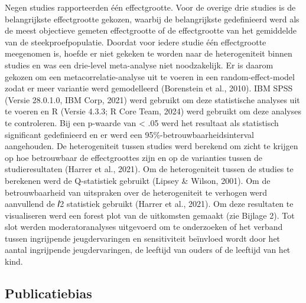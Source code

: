 \documentclass[12pt]{article}
\begin{document}
Negen studies rapporteerden één effectgrootte. Voor de overige drie
studies is de belangrijkste effectgrootte gekozen, waarbij de
belangrijkste gedefinieerd werd als de meest objectieve gemeten
effectgrootte of de effectgrootte van het gemiddelde van de
steekproefpopulatie. Doordat voor iedere studie één effectgrootte
meegenomen is, hoefde er niet gekeken te worden naar de heterogeniteit
binnen studies en was een drie-level meta-analyse niet noodzakelijk. Er
is daarom gekozen om een metacorrelatie-analyse uit te voeren in een
random-effect-model zodat er meer variantie werd gemodelleerd
(Borenstein et al., 2010). IBM SPSS (Versie 28.0.1.0, IBM Corp, 2021)
werd gebruikt om deze statistische analyses uit te voeren en R (Versie
4.3.3; R Core Team, 2024) werd gebruikt om deze analyses te controleren.
Bij een p-waarde van \textless{} .05 werd het resultaat als statistisch
significant gedefinieerd en er werd een 95\%-betrouwbaarheidsinterval
aangehouden. De heterogeniteit tussen studies werd berekend om zicht te
krijgen op hoe betrouwbaar de effectgroottes zijn en op de varianties
tussen de studieresultaten (Harrer et al., 2021). Om de heterogeniteit
tussen de studies te berekenen werd de Q-statistiek gebruikt (Lipsey \&
Wilson, 2001). Om de betrouwbaarheid van uitspraken over de
heterogeniteit te verhogen werd aanvullend de 𝐼2 statistiek gebruikt
(Harrer et al., 2021). Om deze resultaten te visualiseren werd een
forest plot van de uitkomsten gemaakt (zie Bijlage 2). Tot slot werden
moderatoranalyses uitgevoerd om te onderzoeken of het verband tussen
ingrijpende jeugdervaringen en sensitiviteit beïnvloed wordt door het
aantal ingrijpende jeugdervaringen, de leeftijd van ouders of de
leeftijd van het kind.

\subsection{Publicatiebias}\label{publicatiebias}
\end{document}
